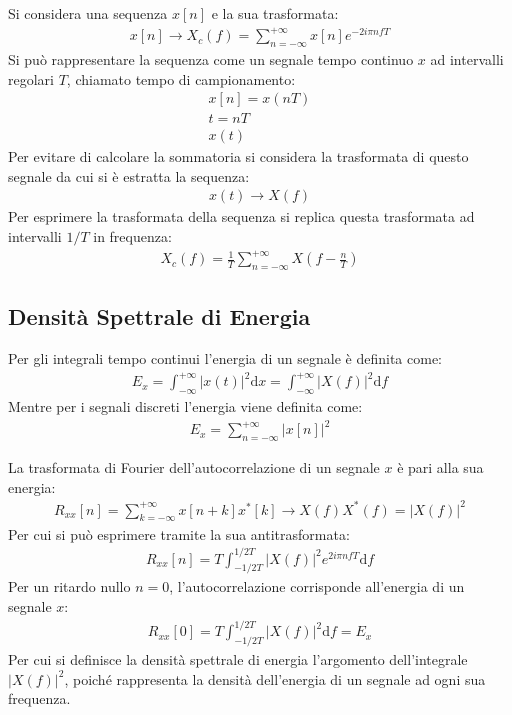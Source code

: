 \documentclass{article}
\newcommand{\df}{\mathrm{d}}
\numberwithin{equation}{subsection}
\begin{document}
Si considera una sequenza $x[n]$ e la sua trasformata:
\begin{gather*}
    x[n]\to X_c(f)=\displaystyle\sum_{n=-\infty}^{+\infty}x[n]e^{-2i\pi nfT}
\end{gather*}
Si può rappresentare la sequenza come un segnale tempo continuo $x$ ad intervalli regolari $T$, chiamato tempo di campionamento:
\begin{gather*}
    x[n]=x(nT)\\
    t=nT\\
    x(t)
\end{gather*}
Per evitare di calcolare la sommatoria si considera la trasformata di questo segnale da cui si è estratta la sequenza: 
\begin{gather*}
    x(t)\to X(f)
\end{gather*}
Per esprimere la trasformata della sequenza si replica questa trasformata ad intervalli $1/T$ in frequenza:
\begin{gather}
    X_c(f)=\displaystyle\frac{1}{T}\sum_{n=-\infty}^{+\infty}X\left(f-\frac{n}{T}\right)
\end{gather}

\subsection{Densità Spettrale di Energia}

Per gli integrali tempo continui l'energia di un segnale è definita come:
\begin{gather*}
    E_x=\displaystyle\int_{-\infty}^{+\infty}|x(t)|^2\df x=\int_{-\infty}^{+\infty}|X(f)|^2\df f
\end{gather*}
Mentre per i segnali discreti l'energia viene definita come:
\begin{gather*}
    E_x=\displaystyle\sum_{n=-\infty}^{+\infty}|x[n]|^2
\end{gather*}

La trasformata di Fourier dell'autocorrelazione di un segnale $x$ è pari alla sua energia:
\begin{gather*}
    R_{xx}[n]=\displaystyle\sum_{k=-\infty}^{+\infty}x[n+k]x^*[k]\to X(f)X^*(f)=|X(f)|^2
\end{gather*}
Per cui si può esprimere tramite la sua antitrasformata:
\begin{gather*}
    R_{xx}[n]=T\displaystyle\int_{-1/2T}^{1/2T}|X(f)|^2e^{2i\pi nfT}\df f
\end{gather*}
Per un ritardo nullo $n=0$, l'autocorrelazione corrisponde all'energia di un segnale $x$:
\begin{gather*}
    R_{xx}[0]=T\displaystyle\int_{-1/2T}^{1/2T}|X(f)|^2\df f=E_x
\end{gather*}
Per cui si definisce la densità spettrale di energia l'argomento dell'integrale $|X(f)|^2$, poiché rappresenta la densità dell'energia di un segnale 
ad ogni sua frequenza.  
\end{document}
